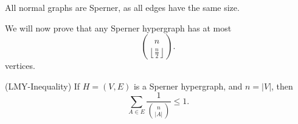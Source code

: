
\begin{note}
	All normal graphs are Sperner, as all edges have the same size.
\end{note}

We will now prove that any Sperner hypergraph has at most \[
	\binom{n}{\left\lfloor \frac{n}{2} \right\rfloor}
.\] vertices.

\begin{lemma}
	(LMY-Inequality) If \( H=(V,E) \) is a Sperner hypergraph, and \( n=|V| \), then \[
		\sum_{A \in E} \frac{1}{\binom{n}{|A|}} \le 1
	.\] 
\end{lemma}
